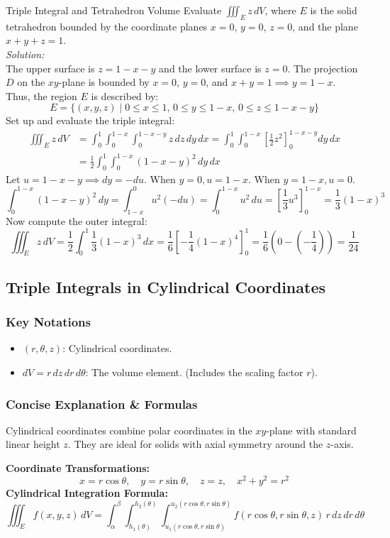 \documentclass[11pt]{article}
\begin{document}
\begin{examplebox}{Triple Integral and Tetrahedron Volume}
    Evaluate $\iiint_E z\,dV$, where $E$ is the solid tetrahedron bounded by the coordinate planes $x = 0$, $y = 0$, $z = 0$, and the plane $x + y + z = 1$.\\
    \textit{Solution:}\\
    The upper surface is $z = 1 - x - y$ and the lower surface is $z = 0$.
    The projection $D$ on the $xy$-plane is bounded by $x=0$, $y=0$, and $x+y=1 \implies y = 1-x$.
    Thus, the region $E$ is described by:
    \[ E = \{(x,y,z) \mid 0 \le x \le 1, \, 0 \le y \le 1-x, \, 0 \le z \le 1-x-y\} \]
    Set up and evaluate the triple integral:
    \begin{align*}
        \iiint_E z\,dV &= \int_0^1 \int_0^{1-x} \int_0^{1-x-y} z\,dz\,dy\,dx = \int_0^1 \int_0^{1-x} \left[ \frac{1}{2}z^2 \right]_0^{1-x-y} dy\,dx \\
        &= \frac{1}{2} \int_0^1 \int_0^{1-x} (1-x-y)^2\,dy\,dx
    \end{align*}
    Let $u = 1-x-y \implies dy = -du$. When $y=0, u=1-x$. When $y=1-x, u=0$.
    \[ \int_0^{1-x} (1-x-y)^2\,dy = \int_{1-x}^0 u^2(-du) = \int_0^{1-x} u^2\,du = \left[ \frac{1}{3}u^3 \right]_0^{1-x} = \frac{1}{3}(1-x)^3 \]
    Now compute the outer integral:
    \[ \iiint_E z\,dV = \frac{1}{2} \int_0^1 \frac{1}{3}(1-x)^3\,dx = \frac{1}{6} \left[ -\frac{1}{4}(1-x)^4 \right]_0^1 = \frac{1}{6}\left( 0 - \left(-\frac{1}{4}\right) \right) = \frac{1}{24} \]
\end{examplebox}


\subsection{Triple Integrals in Cylindrical Coordinates}
\subsubsection*{Key Notations}
\begin{itemize}
    \item $(r, \theta, z)$: Cylindrical coordinates.
    \item $dV = r\,dz\,dr\,d\theta$: The volume element. (Includes the scaling factor $r$).
\end{itemize}

\subsubsection*{Concise Explanation \& Formulas}
Cylindrical coordinates combine polar coordinates in the $xy$-plane with standard linear height $z$. They are ideal for solids with axial symmetry around the $z$-axis.
\begin{formulabox}
    \textbf{Coordinate Transformations:}
    \[ x = r\cos\theta, \quad y = r\sin\theta, \quad z = z, \quad x^2 + y^2 = r^2 \]
    \textbf{Cylindrical Integration Formula:}
    \[ \iiint_E f(x,y,z)\,dV = \int_\alpha^\beta \int_{h_1(\theta)}^{h_2(\theta)} \int_{u_1(r\cos\theta, r\sin\theta)}^{u_2(r\cos\theta, r\sin\theta)} f(r\cos\theta, r\sin\theta, z) \, r\,dz\,dr\,d\theta \]
\end{formulabox}
\end{document}
